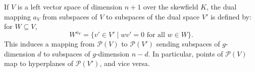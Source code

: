 If $V$ is a left vector space of dimension $n+1$ over the skewfield $K$, the dual mapping $a_V$ from subspaces of $V$ to subspaces of the dual space $V'$ is defined by: for $W \subseteq V$,
$$W^{a_V} = \{v' \in V' \mid w v' = 0 \text{ for all } w \in W\}.$$
This induces a mapping from $\mathcal{P}(V)$ to $\mathcal{P}(V')$ sending subspaces of $g$-dimension $d$ to subspaces of $g$-dimension $n-d$. In particular, points of $\mathcal{P}(V)$ map to hyperplanes of $\mathcal{P}(V')$, and vice versa.
